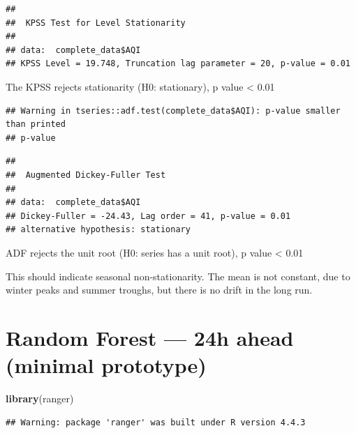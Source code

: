 \documentclass[
]{article}
\newenvironment{Shaded}{\begin{snugshade}}{\end{snugshade}}
\newcommand{\FunctionTok}[1]{\textcolor[rgb]{0.13,0.29,0.53}{\textbf{#1}}}
\newcommand{\NormalTok}[1]{#1}
\newcommand{\SpecialCharTok}[1]{\textcolor[rgb]{0.81,0.36,0.00}{\textbf{#1}}}
\begin{document}
\begin{verbatim}
## 
##  KPSS Test for Level Stationarity
## 
## data:  complete_data$AQI
## KPSS Level = 19.748, Truncation lag parameter = 20, p-value = 0.01
\end{verbatim}

The KPSS rejects stationarity (H0: stationary), p value \textless{} 0.01

\begin{Shaded}
\end{Shaded}

\begin{verbatim}
## Warning in tseries::adf.test(complete_data$AQI): p-value smaller than printed
## p-value
\end{verbatim}

\begin{verbatim}
## 
##  Augmented Dickey-Fuller Test
## 
## data:  complete_data$AQI
## Dickey-Fuller = -24.43, Lag order = 41, p-value = 0.01
## alternative hypothesis: stationary
\end{verbatim}

ADF rejects the unit root (H0: series has a unit root), p value
\textless{} 0.01

This should indicate seasonal non-stationarity. The mean is not
constant, due to winter peaks and summer troughs, but there is no drift
in the long run.

\section{Random Forest --- 24h ahead (minimal
prototype)}\label{random-forest-24h-ahead-minimal-prototype}

\begin{Shaded}
\begin{Highlighting}[]
\FunctionTok{library}\NormalTok{(ranger)}
\end{Highlighting}
\end{Shaded}

\begin{verbatim}
## Warning: package 'ranger' was built under R version 4.4.3
\end{verbatim}
\end{document}
